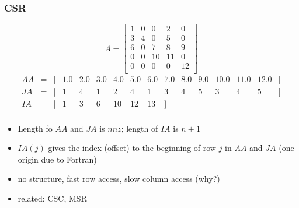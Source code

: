 \documentclass[10pt]{beamer}
\begin{document}
\begin{frame}
\frametitle{CSR}
\begin{equation*}
A=
\begin{bmatrix}
1 & 0 & 0 & 2 & 0\\
3 & 4 & 0 & 5 & 0\\
6 & 0 & 7 & 8 & 9\\
0 & 0 & 10 & 11 & 0\\
0 & 0 & 0 & 0 & 12\\
\end{bmatrix}
\end{equation*}
\begin{equation*}
\begin{array}{llllllllllllllll}
  AA &= & [ & 1.0 & 2.0 & 3.0 & 4.0 & 5.0 & 6.0 & 7.0 & 8.0 & 9.0 & 10.0 & 11.0 & 12.0 & ] \\
  JA &= & [ &  1 &4 &1 &2 &4 &1 &3 &4 &5 &3 &4 &5 & ] \\
  IA &= & [ &  1 &3 &6 &10 &12 &13 & ]&  &  &  &  & \\
\end{array}
\end{equation*}
  \begin{itemize}
    \item Length fo $AA$ and $JA$ is $nnz$; length of $IA$ is $n+1$
    \item $IA(j)$ gives the index (offset) to the beginning of row $j$
      in $AA$ and $JA$ (one origin due to Fortran)
    \item no structure, fast row access, slow column access (why?)
    \item related: CSC, MSR
  \end{itemize}
\end{frame}
\end{document}
